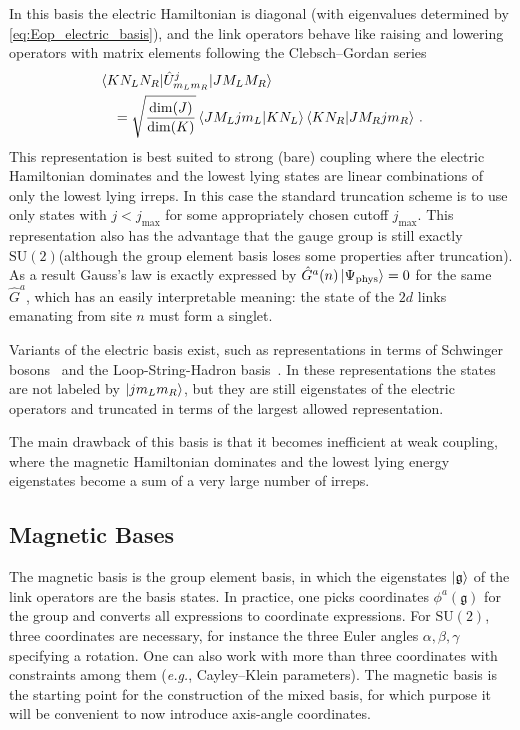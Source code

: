 \documentclass[reprint,superscriptaddress,pra,nofootinbib,preprintnumbers,floatfix]{revtex4-1}
\providecommand{\eg}{\emph{e.g.}}
\providecommand{\sutwo}{$\mathrm{SU}(2)$\xspace}
\providecommand{\g}{{\mathfrak{g}}}
\begin{document}
In this basis the electric Hamiltonian is diagonal (with eigenvalues determined by \cref{eq:Eop_electric_basis}), and the link operators behave like raising and lowering operators with matrix elements following the Clebsch--Gordan series
%
\begin{align}
\label{eq:Uop_elecric_basis}
&\mel{KN_L N_R}{\hat{U}^j_{{m_L}{m_R}}}{JM_L M_R}\\
&\quad = \sqrt{\frac{\dim(J)}{\dim(K)}}\braket{J M_L jm_L }{KN_L} \braket{KN_R}{JM_Rjm_R} \,. \nonumber
\end{align}
%
This representation is best suited to strong (bare) coupling where the electric Hamiltonian dominates and the lowest lying states are linear combinations of only the lowest lying irreps. 
%
In this case the standard truncation scheme is to use only states with $j<j_\mathrm{max}$ for some appropriately chosen cutoff $j_\mathrm{max}$. 
%
This representation also has the advantage that the gauge group is still exactly \sutwo (although the group element basis loses some properties after truncation).
%
As a result Gauss's law is exactly expressed by $\hat{G}^{a}(n) \ket{\Psi_\text{phys}} = 0$ for the same $\hat{G}^a$, which has an easily interpretable meaning: the state of the $2d$ links emanating from site $n$ must form a singlet. 

Variants of the electric basis exist, such as representations in terms of Schwinger bosons~\cite{Mathur:2004kr,mathur2006loop,mathur2007loop} and the Loop-String-Hadron basis~\cite{Raychowdhury:2018osk,Raychowdhury2023}. 
%
In these representations the states are not labeled by $\ket{j m_L m_R}$, but they are still eigenstates of the electric operators and truncated in terms of the largest allowed representation.

The main drawback of this basis is that it becomes inefficient at weak coupling, where the magnetic Hamiltonian dominates and the lowest lying energy eigenstates become a sum of a very large number of irreps.



\subsection{Magnetic Bases}
\label{sec:magnetic_basis}

The magnetic basis is the group element basis, in which the eigenstates $\ket{\g}$ of the link operators are the basis states. 
%
In practice, one picks coordinates $\phi^a(\g)$ for the group and converts all expressions to coordinate expressions. 
%
For \sutwo, three coordinates are necessary, for instance the three Euler angles $\alpha,\beta,\gamma$ specifying a rotation. One can also work with more than three coordinates with constraints among them (\eg, Cayley--Klein parameters).
%
The magnetic basis is the starting point for the construction of the mixed basis, for which purpose it will be convenient to now introduce axis-angle coordinates.
\end{document}
